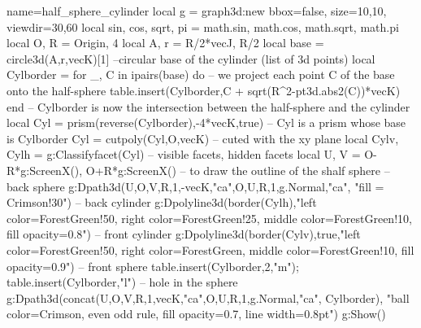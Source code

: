 \documentclass[border=2 mm]{standalone}
\begin{document}
\begin{luadraw}{name=half_sphere_cylinder}
local g = graph3d:new{ bbox=false, size={10,10}, viewdir={30,60}}
local sin, cos, sqrt, pi = math.sin, math.cos, math.sqrt, math.pi
local O, R = Origin, 4
local A, r = R/2*vecJ, R/2
local base = circle3d(A,r,vecK)[1] --circular base of the cylinder (list of 3d points)
local Cylborder = {}
for _, C in ipairs(base) do -- we project each point C of the base onto the half-sphere
    table.insert(Cylborder,C + sqrt(R^2-pt3d.abs2(C))*vecK)
end -- Cylborder is now the intersection between the half-sphere and the cylinder
local Cyl = prism(reverse(Cylborder),-4*vecK,true) -- Cyl is a prism whose base is Cylborder
Cyl = cutpoly(Cyl,{O,vecK}) -- cuted with the xy plane
local Cylv, Cylh = g:Classifyfacet(Cyl) -- visible facets, hidden facets
local U, V = O-R*g:ScreenX(), O+R*g:ScreenX() -- to draw the outline of the shalf sphere
-- back sphere
g:Dpath3d({U,O,V,R,1,-vecK,"ca",O,U,R,1,g.Normal,"ca"}, "fill = Crimson!30")
-- back cylinder
g:Dpolyline3d(border(Cylh),"left color=ForestGreen!50, right color=ForestGreen!25, middle color=ForestGreen!10, fill opacity=0.8")
-- front cylinder
g:Dpolyline3d(border(Cylv),true,"left color=ForestGreen!50, right color=ForestGreen, middle color=ForestGreen!10, fill opacity=0.9")
-- front sphere
table.insert(Cylborder,2,"m"); table.insert(Cylborder,"l") -- hole in the sphere
g:Dpath3d(concat({U,O,V,R,1,vecK,"ca",O,U,R,1,g.Normal,"ca"}, Cylborder), "ball color=Crimson, even odd rule, fill opacity=0.7, line width=0.8pt")
g:Show()
\end{luadraw}
\end{document}
